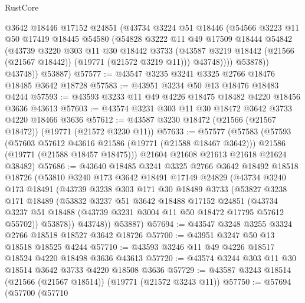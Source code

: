 \begin{lexlean}{RustCore}
\begin{coremodule}
              @3642
              @18446
              @17152
              @24851
              (@43734
                @3224
                @51
                @18446
                (@54566
                  @3223
                  @11
                  @50
                  @17419
                  @18445
                  @54580
                  (@54828
                    @3222
                    @11
                    @49
                    @17509
                    @18444
                    @54842
                    (@43739
                      @3220
                      @303
                      @11
                      @30
                      @18442
                      @3733
                      (@43587 @3219 @18442 (@21566 (@21567 @18442)) (@19771 (@21572 @3219 @11)))
                      @43748))))
              @53878))
          @43748))
      @53887)
@57577 := @43547 @3235 @3241 @3325 @2766 @18476 @18485 @3642 @18728
@57583 := @43951 @3234 @50 @13 @18476 @18483 @4244
@57593 := @43593 @3233 @11 @49 @4226 @18475 @18482 @4220 @18456 @3636 @43613
@57603 := @43574 @3231 @303 @11 @30 @18472 @3642 @3733 @4220 @18466 @3636
@57612 := @43587 @3230 @18472 (@21566 (@21567 @18472)) (@19771 (@21572 @3230 @11))
@57633 := @57577
    (@57583
      (@57593
        (@57603 @57612 @43616 @21586 (@19771 (@21588 @18467 @3642)))
        @21586
        (@19771 (@21588 @18457 @18475)))
      @21604
      @21608
      @21613
      @21618
      @21624
      @38482)
@57686 := @43640
    @18485
    @3241
    @3325
    @2766
    @3642
    @18492
    @18518
    @18726
    (@53810
      @3240
      @173
      @3642
      @18491
      @17149
      @24829
      (@43734
        @3240
        @173
        @18491
        (@43739
          @3238
          @303
          @171
          @30
          @18489
          @3733
          (@53827
            @3238
            @171
            @18489
            (@53832
              @3237
              @51
              @3642
              @18488
              @17152
              @24851
              (@43734 @3237 @51 @18488 (@43739 @3231 @3004 @11 @50 @18472 @17795 @57612 @55702))
              @53878))
          @43748))
      @53887)
@57694 := @43547 @3248 @3255 @3324 @2766 @18518 @18527 @3642 @18726
@57700 := @43951 @3247 @50 @13 @18518 @18525 @4244
@57710 := @43593 @3246 @11 @49 @4226 @18517 @18524 @4220 @18498 @3636 @43613
@57720 := @43574 @3244 @303 @11 @30 @18514 @3642 @3733 @4220 @18508 @3636
@57729 := @43587 @3243 @18514 (@21566 (@21567 @18514)) (@19771 (@21572 @3243 @11))
@57750 := @57694
    (@57700
      (@57710

\end{coremodule}
\end{lexlean}
